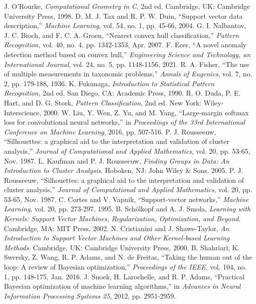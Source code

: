 \documentclass[conference]{IEEEtran}
\begin{document}
\begin{thebibliography}{99}
 J. O'Rourke, \textit{Computational Geometry in C}, 2nd ed. Cambridge, UK: Cambridge University Press, 1998.
 D. M. J. Tax and R. P. W. Duin, “Support vector data description,” \textit{Machine Learning}, vol. 54, no. 1, pp. 45-66, 2004.
 G. I. Nalbantov, J. C. Bioch, and F. C. A. Groen, “Nearest convex hull classification,” \textit{Pattern Recognition}, vol. 40, no. 4, pp. 1342-1353, Apr. 2007.
 F. Ecer, “A novel anomaly detection method based on convex hull,” \textit{Engineering Science and Technology, an International Journal}, vol. 24, no. 5, pp. 1148-1156, 2021.
 R. A. Fisher, “The use of multiple measurements in taxonomic problems,” \textit{Annals of Eugenics}, vol. 7, no. 2, pp. 179-188, 1936.
 K. Fukunaga, \textit{Introduction to Statistical Pattern Recognition}, 2nd ed. San Diego, CA: Academic Press, 1990.
 R. O. Duda, P. E. Hart, and D. G. Stork, \textit{Pattern Classification}, 2nd ed. New York: Wiley-Interscience, 2000.
 W. Liu, Y. Wen, Z. Yu, and M. Yang, “Large-margin softmax loss for convolutional neural networks,” in \textit{Proceedings of the 33rd International Conference on Machine Learning}, 2016, pp. 507-516.
 P. J. Rousseeuw, “Silhouettes: a graphical aid to the interpretation and validation of cluster analysis,” \textit{Journal of Computational and Applied Mathematics}, vol. 20, pp. 53-65, Nov. 1987.
 L. Kaufman and P. J. Rousseeuw, \textit{Finding Groups in Data: An Introduction to Cluster Analysis}. Hoboken, NJ: John Wiley \& Sons, 2005.
 P. J. Rousseeuw, “Silhouettes: a graphical aid to the interpretation and validation of cluster analysis,” \textit{Journal of Computational and Applied Mathematics}, vol. 20, pp. 53-65, Nov. 1987.
 C. Cortes and V. Vapnik, “Support-vector networks,” \textit{Machine Learning}, vol. 20, pp. 273-297, 1995.
 B. Schölkopf and A. J. Smola, \textit{Learning with Kernels: Support Vector Machines, Regularization, Optimization, and Beyond}. Cambridge, MA: MIT Press, 2002.
 N. Cristianini and J. Shawe-Taylor, \textit{An Introduction to Support Vector Machines and Other Kernel-based Learning Methods}. Cambridge, UK: Cambridge University Press, 2000.
 B. Shahriari, K. Swersky, Z. Wang, R. P. Adams, and N. de Freitas, “Taking the human out of the loop: A review of Bayesian optimization,” \textit{Proceedings of the IEEE}, vol. 104, no. 1, pp. 148-175, Jan. 2016.
 J. Snoek, H. Larochelle, and R. P. Adams, “Practical Bayesian optimization of machine learning algorithms,” in \textit{Advances in Neural Information Processing Systems 25}, 2012, pp. 2951-2959.

\end{thebibliography}
\end{document}

